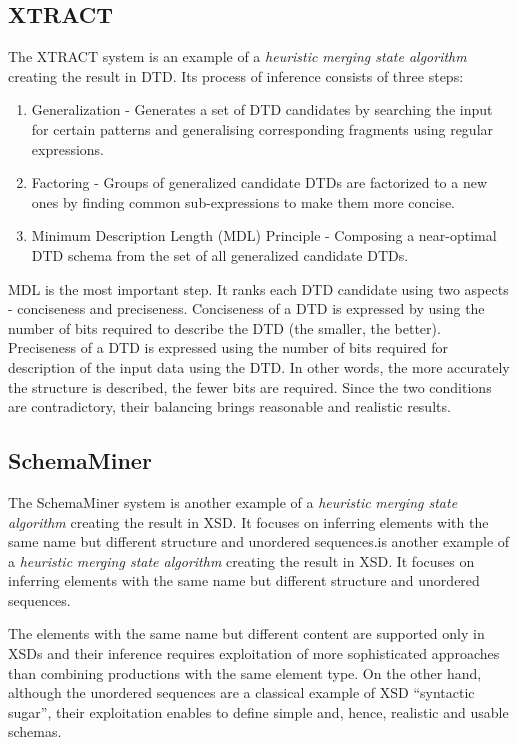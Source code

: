 \subsection{XTRACT}
The XTRACT  system is an example of a \emph{heuristic} \emph{merging state algorithm} creating the result in DTD. Its process of inference consists of three steps:
\begin{enumerate}
\item Generalization - Generates a set of DTD candidates by searching the input for certain patterns and generalising corresponding fragments using regular expressions.
\item Factoring - Groups of generalized candidate DTDs are factorized to a new ones by finding common sub-expressions to make them more concise. 
\item Minimum Description Length (MDL) Principle - Composing a near-optimal DTD schema from the set of all generalized candidate DTDs.
\end{enumerate}

MDL is the most important step. It ranks each DTD candidate using two aspects - conciseness and preciseness. Conciseness of a DTD is expressed by using the number of bits required to describe the DTD (the smaller, the better). Preciseness of a DTD is expressed using the number of bits required for description of the input data using the DTD. In other words, the more accurately the structure is described, the fewer bits are required. Since the two conditions are contradictory, their balancing brings reasonable and realistic results.

\subsection{SchemaMiner}
The SchemaMiner system  is another example of a \emph{heuristic} \emph{merging state algorithm} creating the result in XSD. It focuses on inferring elements with the same name but different structure and unordered sequences.is another example of a \emph{heuristic} \emph{merging state algorithm} creating the result in XSD. It focuses on inferring elements with the same name but different structure and unordered sequences.

The elements with the same name but different content are supported only in XSDs and their inference requires exploitation of more sophisticated approaches than combining productions with the same element
type. On the other hand, although the unordered sequences are a classical example of XSD “syntactic sugar”, their exploitation enables to define simple and, hence, realistic and usable schemas.

